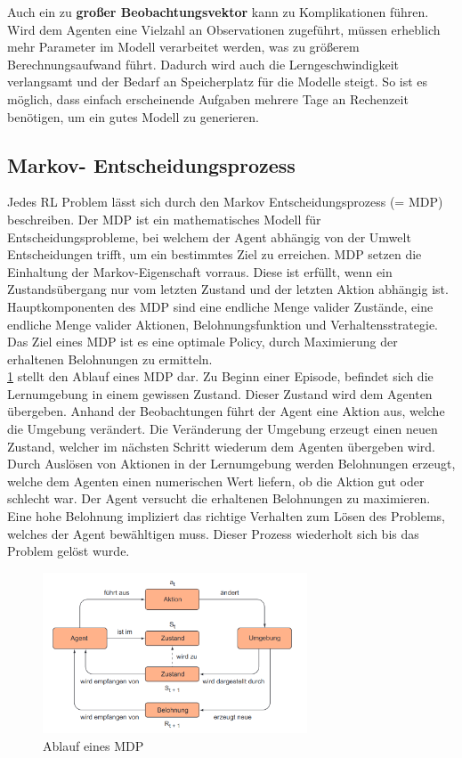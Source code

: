 Auch ein zu \textbf{großer Beobachtungsvektor} kann zu Komplikationen führen. Wird dem Agenten eine Vielzahl an Observationen zugeführt, müssen erheblich mehr Parameter im Modell verarbeitet werden, was zu größerem Berechnungsaufwand führt. Dadurch wird auch die Lerngeschwindigkeit verlangsamt und der Bedarf an Speicherplatz für die Modelle steigt. So ist es möglich, dass einfach erscheinende Aufgaben mehrere Tage an Rechenzeit benötigen, um ein gutes Modell zu generieren.
\cite{zai_einstieg_2020}

\newpage
\subsection{Markov- Entscheidungsprozess}
Jedes RL Problem lässt sich durch den Markov Entscheidungsprozess (= MDP) beschreiben.
Der MDP ist ein mathematisches Modell für Entscheidungsprobleme, bei welchem der Agent abhängig von der Umwelt Entscheidungen trifft, um ein bestimmtes Ziel zu erreichen.
MDP setzen die Einhaltung der Markov-Eigenschaft vorraus. Diese ist erfüllt, wenn ein Zustandsübergang nur vom letzten Zustand und der letzten Aktion abhängig ist.
Hauptkomponenten des MDP sind eine endliche Menge valider Zustände, eine endliche Menge valider Aktionen, Belohnungsfunktion und Verhaltensstrategie.
Das Ziel eines MDP ist es eine optimale Policy, durch Maximierung der erhaltenen Belohnungen zu ermitteln. \\
\ref{fig:markov} stellt den Ablauf eines MDP dar. Zu Beginn einer Episode, befindet sich die Lernumgebung in einem gewissen Zustand. Dieser Zustand wird dem Agenten übergeben. Anhand der Beobachtungen führt der Agent eine Aktion aus, welche die Umgebung verändert. Die Veränderung der Umgebung erzeugt einen neuen Zustand, welcher im nächsten Schritt wiederum dem Agenten übergeben wird. Durch Auslösen von Aktionen in der Lernumgebung werden Belohnungen erzeugt, welche dem Agenten einen numerischen Wert liefern, ob die Aktion gut oder schlecht war. Der Agent versucht die erhaltenen Belohnungen zu maximieren.
Eine hohe Belohnung impliziert das richtige Verhalten zum Lösen des Problems, welches der Agent bewähltigen muss.
Dieser Prozess wiederholt sich bis das Problem gelöst wurde. \cite{zai_einstieg_2020}

\begin{figure}[!h]
	\centering
	\includegraphics[width=0.7\textwidth]{Bilder/Markov.png}
	\caption{Ablauf eines MDP \cite{zai_einstieg_2020}}
	\label{fig:markov}
\end{figure}


